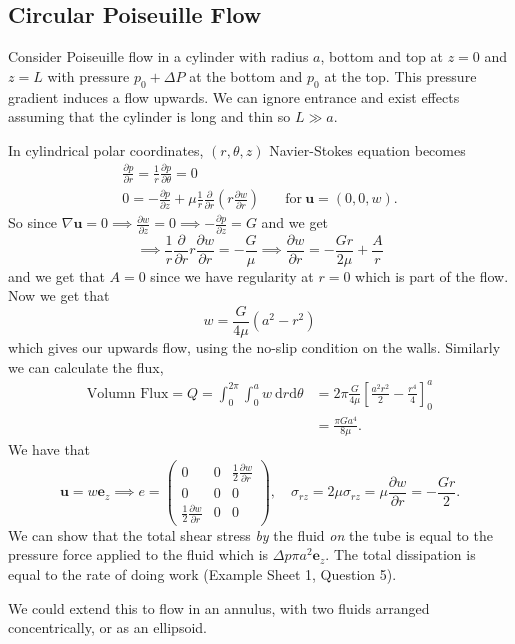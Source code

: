 \documentclass{article}
\begin{document}
\subsection{Circular Poiseuille Flow}
Consider Poiseuille flow in a cylinder with radius $ a $, bottom and top at $ z=0 $ and $ z=L $ with pressure $ p_0 + \Delta P $ at the bottom and $ p_0 $ at the top. This pressure gradient induces a flow upwards. We can ignore entrance and exist effects assuming that the cylinder is long and thin so $ L\gg a $.\par
In cylindrical polar coordinates, $ (r,\theta,z) $ Navier-Stokes equation becomes
\begin{align*}
	\frac{\partial p}{\partial r} = \frac 1r \frac{\partial p}{\partial \theta} = 0 &\\
	0 = -\frac{\partial p}{\partial z} + \mu \frac 1r \frac{\partial}{\partial r} \left(r\frac{\partial w}{\partial r}\right) &\quad \text{for} \ \mathbf u= (0,0,w).
\end{align*}
So since $ \nabla\mathbf u = 0 \implies\frac{\partial w}{\partial z} = 0\implies -\frac{\partial p}{\partial z} = G $ and we get
\[
	\implies \frac 1r \frac\partial{\partial r} r \frac{\partial w}{\partial r} = -\frac G\mu \implies\frac{\partial w}{\partial r} = -\frac {Gr}{2\mu} + \frac Ar
\]
and we get that $ A=0 $ since we have regularity at $ r=0 $ which is part of the flow. Now we get that
\[
	w = \frac G{4\mu}\left(a^2 - r^2\right)
\]
which gives our upwards flow, using the no-slip condition on the walls. Similarly we can calculate the flux,
\begin{align*}
	\text{Volumn Flux} = Q = \int_0^{2\pi} \int_0^a w \ \mathrm dr\mathrm d\theta &= 2\pi \frac{G}{4\mu} \left[\frac{a^2r^2}2 - \frac{r^4}4 \right]^a_0 \\
	&=\frac{\pi Ga^4}{8\mu}.
\end{align*}
We have that
\[
  \mathbf u =w \mathbf e_z \implies e = \begin{pmatrix}
	  0 & 0 & \frac 12 \frac{\partial w}{\partial r} \\
	  0 & 0 & 0 \\
	  \frac 12 \frac{\partial w}{\partial r} & 0 & 0
  \end{pmatrix},\quad \sigma_{rz} = 2\mu\sigma_{rz} = \mu\frac{\partial w}{\partial r} = -\frac {Gr}2.
\]
We can show that the total shear stress \textit{by} the fluid \textit{on} the tube is equal to the pressure force applied to the fluid which is $ \Delta p \pi a^2\mathbf e_z $. The total dissipation is equal to the rate of doing work (Example Sheet 1, Question 5).
\begin{example}
  We could extend this to flow in an annulus, with two fluids arranged concentrically, or as an ellipsoid.
\end{example}
\end{document}
